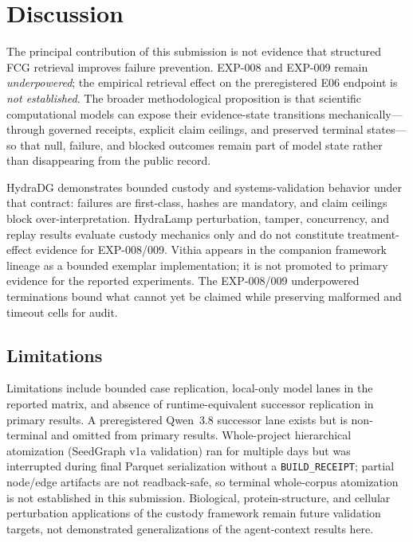 \documentclass{article}
\begin{document}
\section{Discussion}

The principal contribution of this submission is not evidence that structured FCG retrieval improves failure prevention.
EXP-008 and EXP-009 remain \emph{underpowered}; the empirical retrieval effect on the preregistered E06 endpoint is \emph{not established}.
The broader methodological proposition is that scientific computational models can expose their evidence-state transitions mechanically---through governed receipts, explicit claim ceilings, and preserved terminal states---so that null, failure, and blocked outcomes remain part of model state rather than disappearing from the public record.

HydraDG demonstrates bounded custody and systems-validation behavior under that contract: failures are first-class, hashes are mandatory, and claim ceilings block over-interpretation.
HydraLamp perturbation, tamper, concurrency, and replay results evaluate custody mechanics only and do not constitute treatment-effect evidence for EXP-008/009.
Vithia appears in the companion framework lineage as a bounded exemplar implementation; it is not promoted to primary evidence for the reported experiments.
The EXP-008/009 underpowered terminations bound what cannot yet be claimed while preserving malformed and timeout cells for audit.

\subsection{Limitations}
\label{sec:limitations}

Limitations include bounded case replication, local-only model lanes in the reported matrix, and absence of runtime-equivalent successor replication in primary results.
A preregistered Qwen~3.8 successor lane exists but is non-terminal and omitted from primary results.
Whole-project hierarchical atomization (SeedGraph v1a validation) ran for multiple days but was interrupted during final Parquet serialization without a \texttt{BUILD\_RECEIPT}; partial node/edge artifacts are not readback-safe, so terminal whole-corpus atomization is not established in this submission.
Biological, protein-structure, and cellular perturbation applications of the custody framework remain future validation targets, not demonstrated generalizations of the agent-context results here.
\end{document}
